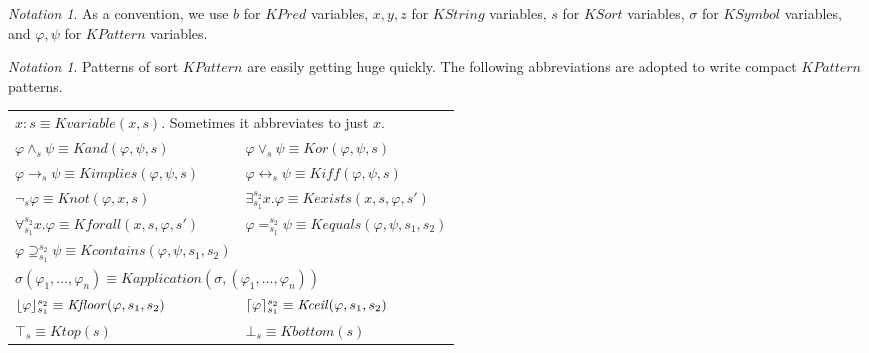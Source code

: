 \documentclass[UTF8,11pt]{article}
\newcounter{thmcounter}
\theoremstyle{plain}
\theoremstyle{definition}
\theoremstyle{remark}
\newtheorem{notation}[thmcounter]{Notation}
\newcommand{\cln}{{:}}
\DeclarePairedDelimiter{\ceil}{\lceil}{\rceil}
\DeclarePairedDelimiter{\floor}{\lfloor}{\rfloor}
\newcommand{\KPred}{\mathit{KPred}}
\newcommand{\KString}{\mathit{KString}}
\newcommand{\KSort}{\mathit{KSort}}
\newcommand{\KSymbol}{\mathit{KSymbol}}
\newcommand{\KPattern}{\mathit{KPattern}}
\newcommand{\Kvariable}{\mathit{Kvariable}}
\newcommand{\Kand}{\mathit{Kand}}
\newcommand{\Kor}{\mathit{Kor}}
\newcommand{\Kimplies}{\mathit{Kimplies}}
\newcommand{\Kiff}{\mathit{Kiff}}
\newcommand{\Knot}{\mathit{Knot}}
\newcommand{\Kapplication}{\mathit{Kapplication}}
\newcommand{\Kexists}{\mathit{Kexists}}
\newcommand{\Kforall}{\mathit{Kforall}}
\newcommand{\Kequals}{\mathit{Kequals}}
\newcommand{\Kcontains}{\mathit{Kcontains}}
\newcommand{\Ktop}{\mathit{Ktop}}
\newcommand{\Kbottom}{\mathit{Kbottom}}
\newcommand{\Kfloor}{\mathit{Kfloor}}
\newcommand{\Kceil}{\mathit{Kceil}}
\newcommand{\kand}{\wedge}
\newcommand{\kor}{\vee}
\newcommand{\kimplies}{\to}
\newcommand{\kiff}{\leftrightarrow}
\newcommand{\knot}{\neg}
\newcommand{\kexists}{\exists}
\newcommand{\kforall}{\forall}
\newcommand{\kequals}{=}
\newcommand{\kcontains}{\supseteq}
\newcommand{\kfloor}{\floor}
\newcommand{\kceil}{\ceil}
\newcommand{\ktop}{\top}
\newcommand{\kbottom}{\bot}
\begin{document}
\begin{notation}\label{notation:variables-about-KPattern}
	As a convention, we use $b$ for $\KPred$ variables, $x, y, z$ for 
	$\KString$ variables, $s$ for $\KSort$ variables, $\sigma$ for 
	$\KSymbol$ variables, and $\varphi, \psi$ for $\KPattern$ variables. 
\end{notation}

\begin{notation}
	Patterns of sort $\KPattern$ are easily getting huge quickly.
	The following abbreviations are adopted to write compact $\KPattern$ patterns.
	\begin{center}
		\begin{tabular}{ll}
			\multicolumn{2}{l}{$x \cln s \equiv \Kvariable(x, s)$. Sometimes it 
				abbreviates to just $x$.}
			\\
			$\varphi \kand_s \psi \equiv \Kand(\varphi, \psi, s)$
			& $\varphi \kor_s \psi \equiv \Kor(\varphi, \psi, s)$
			\\
			$\varphi \kimplies_s \psi \equiv \Kimplies(\varphi, \psi, s)$
			&	$\varphi \kiff_s \psi \equiv \Kiff(\varphi, \psi, s)$
			\\
			$\knot_s \varphi \equiv \Knot(\varphi, x, s)$
			& $\kexists_{s_1}^{s_2} x . \varphi \equiv \Kexists(x,s,\varphi,s')$
			\\
			$\kforall_{s_1}^{s_2} x . \varphi \equiv \Kforall(x,s,\varphi,s')$
			& $\varphi \kequals_{s_1}^{s_2} \psi \equiv \Kequals(\varphi, \psi, s_1, s_2)$
			\\
			$\varphi \kcontains_{s_1}^{s_2} \psi \equiv \Kcontains(\varphi, \psi, s_1, s_2)$
			\\
			\multicolumn{2}{l}{$\sigma(\varphi_1,\dots,\varphi_n) \equiv \Kapplication(\sigma, (\varphi_1,\dots,\varphi_n))$}
			\\
			$\kfloor{\varphi}_{s_1}^{s_2} \equiv \Kfloor(\varphi, s_1, s_2)$
			& $\kceil{\varphi}_{s_1}^{s_2} \equiv \Kceil(\varphi, s_1, s_2)$
			\\
			$\ktop_s \equiv \Ktop(s)$
			& $\kbottom_s \equiv \Kbottom(s)$
		\end{tabular}
	\end{center}
\end{notation}
\end{document}
